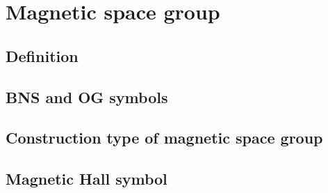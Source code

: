 \section{\label{sec:msg}Magnetic space group}

\subsection{Definition}

\subsection{BNS and OG symbols}

\subsection{Construction type of magnetic space group}

\subsection{Magnetic Hall symbol}
